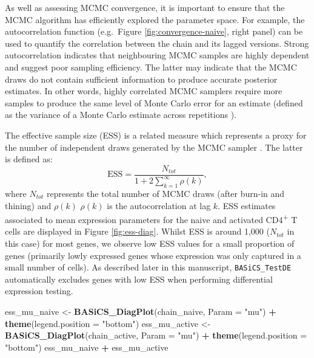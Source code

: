 \documentclass[9pt,a4paper,]{extarticle}
\newenvironment{Shaded}{\begin{snugshade}}{\end{snugshade}}
\newcommand{\DataTypeTok}[1]{\textcolor[rgb]{0.13,0.29,0.53}{#1}}
\newcommand{\KeywordTok}[1]{\textcolor[rgb]{0.13,0.29,0.53}{\textbf{#1}}}
\newcommand{\NormalTok}[1]{#1}
\newcommand{\OperatorTok}[1]{\textcolor[rgb]{0.81,0.36,0.00}{\textbf{#1}}}
\newcommand{\StringTok}[1]{\textcolor[rgb]{0.31,0.60,0.02}{#1}}
\begin{document}
As well as assessing MCMC convergence, it is important to ensure that the MCMC
algorithm has efficiently explored the parameter space.
For example, the autocorrelation function (e.g.~Figure
\ref{fig:convergence-naive}, right panel) can be used to quantify the
correlation between the chain and its lagged versions.
Strong autocorrelation indicates that neighbouring MCMC samples are highly
dependent and suggest poor sampling efficiency.
The latter may indicate that the MCMC draws do not contain
sufficient information to produce accurate posterior estimates.
In other words, highly correlated MCMC samplers require more samples to produce
the same level of Monte Carlo error for an estimate
(defined as the variance of a Monte Carlo estimate across repetitions \citep{Koehler2009}).

The effective sample size (ESS) is a related measure which represents a proxy
for the number of independent draws generated by the MCMC sampler \citep{Gelman2014}.
The latter is defined as:
\[
  \mbox{ESS} = \frac{N_{tot}}{1 + 2\sum_{k=1}^\infty \rho(k)},
\]
where \(N_{tot}\) represents the total number of MCMC draws (after burn-in and
thining) and \(\rho(k)\) \(\rho(k)\) is the autocorrelation at lag \(k\).
ESS estimates associated to mean expression parameters for the naive and
activated CD4\textsuperscript{+} T cells are displayed in Figure \ref{fig:ess-diag}.
Whilst ESS is around 1,000 (\(N_{tot}\) in this case) for most genes, we observe
low ESS values for a small proportion of genes (primarily lowly expressed genes
whose expression was only captured in a small number of cells).
As described later in this manuscript, \texttt{BASiCS\_TestDE} automatically excludes
genes with low ESS when performing differential expression testing.

\begin{Shaded}
\begin{Highlighting}[]
\NormalTok{ess_mu_naive <-}\StringTok{ }\KeywordTok{BASiCS_DiagPlot}\NormalTok{(chain_naive, }\DataTypeTok{Param =} \StringTok{"mu"}\NormalTok{) }\OperatorTok{+}
\StringTok{  }\KeywordTok{theme}\NormalTok{(}\DataTypeTok{legend.position =} \StringTok{"bottom"}\NormalTok{)}
\NormalTok{ess_mu_active <-}\StringTok{ }\KeywordTok{BASiCS_DiagPlot}\NormalTok{(chain_active, }\DataTypeTok{Param =} \StringTok{"mu"}\NormalTok{) }\OperatorTok{+}
\StringTok{  }\KeywordTok{theme}\NormalTok{(}\DataTypeTok{legend.position =} \StringTok{"bottom"}\NormalTok{)}
\NormalTok{ess_mu_naive }\OperatorTok{+}\StringTok{ }\NormalTok{ess_mu_active}
\end{Highlighting}
\end{Shaded}
\end{document}
